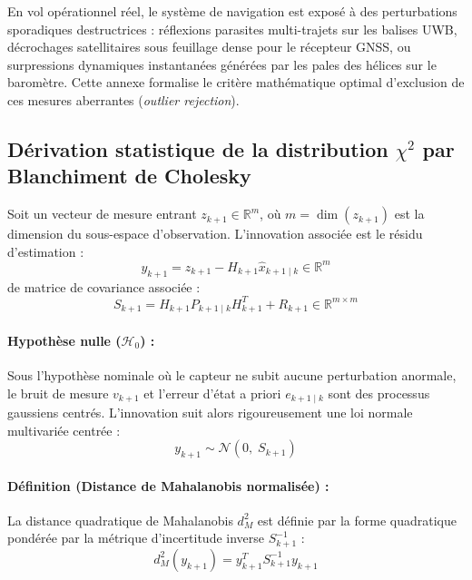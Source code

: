 \documentclass[../Formulations_Kalman.tex]{subfiles}
\begin{document}
En vol opérationnel réel, le système de navigation est exposé à des perturbations sporadiques destructrices : réflexions parasites multi-trajets sur les balises UWB, décrochages satellitaires sous feuillage dense pour le récepteur GNSS, ou surpressions dynamiques instantanées générées par les pales des hélices sur le baromètre. Cette annexe formalise le critère mathématique optimal d'exclusion de ces mesures aberrantes (\textit{outlier rejection}).

\subsection{\texorpdfstring{Dérivation statistique de la distribution $\chi^2$ par Blanchiment de Cholesky}{Dérivation statistique de la distribution Chi-2 par Blanchiment de Cholesky}}

Soit un vecteur de mesure entrant $z_{k+1} \in \mathbb{R}^m$, où $m = \dim(z_{k+1})$ est la dimension du sous-espace d'observation. L'innovation associée est le résidu d'estimation :
\begin{equation}
y_{k+1} = z_{k+1} - H_{k+1} \hat{x}_{k+1\mid k} \in \mathbb{R}^m
\end{equation}
de matrice de covariance associée :
\begin{equation}
S_{k+1} = H_{k+1} P_{k+1\mid k} H_{k+1}^T + R_{k+1} \in \mathbb{R}^{m \times m}
\end{equation}

\paragraph{Hypothèse nulle ($\mathcal{H}_0$) :}
Sous l'hypothèse nominale où le capteur ne subit aucune perturbation anormale, le bruit de mesure $v_{k+1}$ et l'erreur d'état a priori $e_{k+1\mid k}$ sont des processus gaussiens centrés. L'innovation suit alors rigoureusement une loi normale multivariée centrée :
\begin{equation}
y_{k+1} \sim \mathcal{N}\left(0, \; S_{k+1}\right)
\end{equation}

\paragraph{Définition (Distance de Mahalanobis normalisée) :}
La distance quadratique de Mahalanobis $d_M^2$ est définie par la forme quadratique pondérée par la métrique d'incertitude inverse $S_{k+1}^{-1}$ :
\begin{equation}
d_M^2(y_{k+1}) = y_{k+1}^T S_{k+1}^{-1} y_{k+1}
\end{equation}
\end{document}
